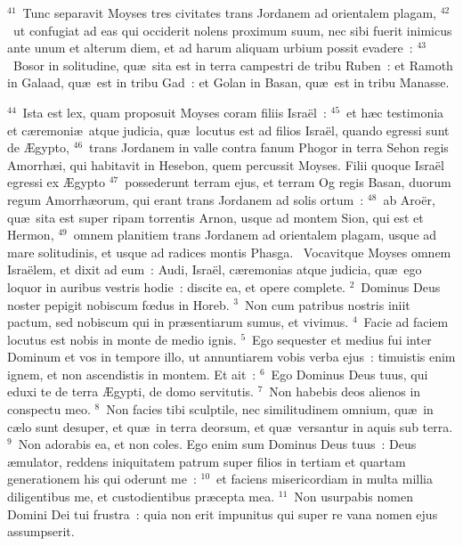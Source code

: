 ${}^{41}$~Tunc separavit Moyses tres civitates trans Jordanem ad orientalem plagam,
${}^{42}$~ut confugiat ad eas qui occiderit nolens proximum suum, nec sibi fuerit inimicus ante unum et alterum diem, et ad harum aliquam urbium possit evadere~:
${}^{43}$~Bosor in solitudine, qu\ae\ sita est in terra campestri de tribu Ruben~: et Ramoth in Galaad, qu\ae\ est in tribu Gad~: et Golan in Basan, qu\ae\ est in tribu Manasse.


${}^{44}$~Ista est lex, quam proposuit Moyses coram filiis Isra\"el~:
${}^{45}$~et h\ae c testimonia et c\ae remoni\ae\ atque judicia, qu\ae\ locutus est ad filios Isra\"el, quando egressi sunt de \AE gypto,
${}^{46}$~trans Jordanem in valle contra fanum Phogor in terra Sehon regis Amorrh\ae i, qui habitavit in Hesebon, quem percussit Moyses. Filii quoque Isra\"el egressi ex \AE gypto
${}^{47}$~possederunt terram ejus, et terram Og regis Basan, duorum regum Amorrh\ae orum, qui erant trans Jordanem ad solis ortum~:
${}^{48}$~ab Aro\"er, qu\ae\ sita est super ripam torrentis Arnon, usque ad montem Sion, qui est et Hermon,
${}^{49}$~omnem planitiem trans Jordanem ad orientalem plagam, usque ad mare solitudinis, et usque ad radices montis Phasga.
~\lettrine[lines=10,image=true,loversize=0.05,lraise=-0.03]{V}{}ocavitque Moyses omnem Isra\"elem, et dixit ad eum~: Audi, Isra\"el, c\ae remonias atque judicia, qu\ae\ ego loquor in auribus vestris hodie~: discite ea, et opere complete.
${}^{2}$~Dominus Deus noster pepigit nobiscum fœdus in Horeb.
${}^{3}$~Non cum patribus nostris iniit pactum, sed nobiscum qui in pr\ae sentiarum sumus, et vivimus.
${}^{4}$~Facie ad faciem locutus est nobis in monte de medio ignis.
${}^{5}$~Ego sequester et medius fui inter Dominum et vos in tempore illo, ut annuntiarem vobis verba ejus~: timuistis enim ignem, et non ascendistis in montem. Et ait~:
${}^{6}$~Ego Dominus Deus tuus, qui eduxi te de terra \AE gypti, de domo servitutis.
${}^{7}$~Non habebis deos alienos in conspectu meo.
${}^{8}$~Non facies tibi sculptile, nec similitudinem omnium, qu\ae\ in c\ae lo sunt desuper, et qu\ae\ in terra deorsum, et qu\ae\ versantur in aquis sub terra.
${}^{9}$~Non adorabis ea, et non coles. Ego enim sum Dominus Deus tuus~: Deus \ae mulator, reddens iniquitatem patrum super filios in tertiam et quartam generationem his qui oderunt me~:
${}^{10}$~et faciens misericordiam in multa millia diligentibus me, et custodientibus pr\ae cepta mea.
${}^{11}$~Non usurpabis nomen Domini Dei tui frustra~: quia non erit impunitus qui super re vana nomen ejus assumpserit.
